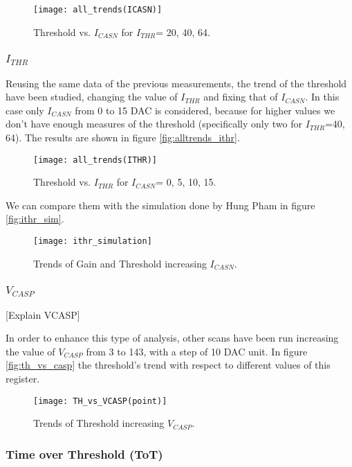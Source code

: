 \begin{figure}[h!]
\centering
\texttt{[image: all\_trends(ICASN)]}
\caption{Threshold vs. $I_{CASN}$ for $I_{THR}$= 20, 40, 64.}
\label{fig:alltrends_icasn}
\end{figure}

\subsubsection{$I_{THR}$}

Reusing the same data of the previous measurements, the trend of the threshold have been studied, changing the value of $I_{THR}$ and fixing that of $I_{CASN}$. In this case only $I_{CASN}$ from 0 to 15 DAC is considered, because for higher values we don't have enough measures of the threshold (specifically only two for $I_{THR}$=40, 64). The results are shown in figure \vref{fig:alltrends_ithr}.

\begin{figure}[h!]
\centering
\texttt{[image: all\_trends(ITHR)]}
\caption{Threshold vs. $I_{THR}$ for $I_{CASN}$= 0, 5, 10, 15.}
\label{fig:alltrends_ithr}
\end{figure}

We can compare them with the simulation done by Hung Pham in figure \vref{fig:ithr_sim}. 

\begin{figure}[h!]
\centering
\texttt{[image: ithr\_simulation]}
\caption{Trends of Gain and Threshold increasing $I_{CASN}$.}
\label{fig:ithr_sim}
\end{figure}

\subsubsection{$V_{CASP}$}

[Explain VCASP]

In order to enhance this type of analysis, other scans have been run increasing the value of $V_{CASP}$ from 3 to 143, with a step of 10 DAC unit. In figure \vref{fig:th_vs_casp} the threshold's trend with respect to different values of this register.

\begin{figure}[h!]
\centering
\texttt{[image: TH\_vs\_VCASP(point)]}
\caption{Trends of Threshold increasing $V_{CASP}$.}
\label{fig:th_vs_casp}
\end{figure}



\subsubsection{Time over Threshold (ToT)}


